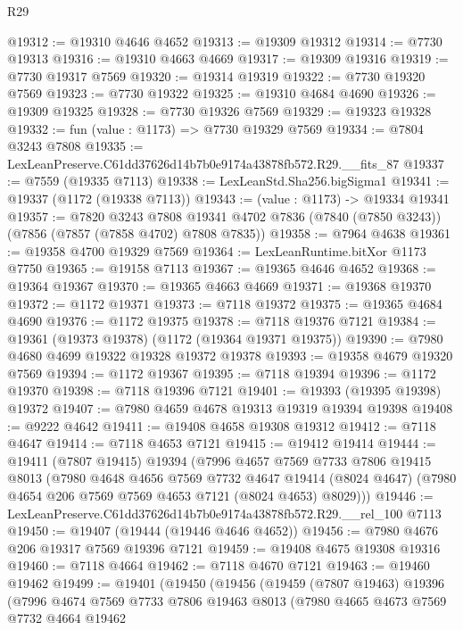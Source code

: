 \begin{lexlean}{R29}
\begin{coremodule}
@19312 := @19310 @4646 @4652
@19313 := @19309 @19312
@19314 := @7730 @19313
@19316 := @19310 @4663 @4669
@19317 := @19309 @19316
@19319 := @7730 @19317 @7569
@19320 := @19314 @19319
@19322 := @7730 @19320 @7569
@19323 := @7730 @19322
@19325 := @19310 @4684 @4690
@19326 := @19309 @19325
@19328 := @7730 @19326 @7569
@19329 := @19323 @19328
@19332 := fun (value : @1173) => @7730 @19329 @7569
@19334 := @7804 @3243 @7808
@19335 := LexLeanPreserve.C61dd37626d14b7b0e9174a43878fb572.R29.__fits_87
@19337 := @7559 (@19335 @7113)
@19338 := LexLeanStd.Sha256.bigSigma1
@19341 := @19337 (@1172 (@19338 @7113))
@19343 := (value : @1173) -> @19334 @19341
@19357 := @7820
    @3243
    @7808
    @19341
    @4702
    @7836
    (@7840 (@7850 @3243))
    (@7856 (@7857 (@7858 @4702) @7808 @7835))
@19358 := @7964 @4638
@19361 := @19358 @4700 @19329 @7569
@19364 := LexLeanRuntime.bitXor @1173 @7750
@19365 := @19158 @7113
@19367 := @19365 @4646 @4652
@19368 := @19364 @19367
@19370 := @19365 @4663 @4669
@19371 := @19368 @19370
@19372 := @1172 @19371
@19373 := @7118 @19372
@19375 := @19365 @4684 @4690
@19376 := @1172 @19375
@19378 := @7118 @19376 @7121
@19384 := @19361 (@19373 @19378) (@1172 (@19364 @19371 @19375))
@19390 := @7980 @4680 @4699 @19322 @19328 @19372 @19378
@19393 := @19358 @4679 @19320 @7569
@19394 := @1172 @19367
@19395 := @7118 @19394
@19396 := @1172 @19370
@19398 := @7118 @19396 @7121
@19401 := @19393 (@19395 @19398) @19372
@19407 := @7980 @4659 @4678 @19313 @19319 @19394 @19398
@19408 := @9222 @4642
@19411 := @19408 @4658 @19308 @19312
@19412 := @7118 @4647
@19414 := @7118 @4653 @7121
@19415 := @19412 @19414
@19444 := @19411
    (@7807 @19415)
    @19394
    (@7996
      @4657
      @7569
      @7733
      @7806
      @19415
      @8013
      (@7980
        @4648
        @4656
        @7569
        @7732
        @4647
        @19414
        (@8024 @4647)
        (@7980 @4654 @206 @7569 @7569 @4653 @7121 (@8024 @4653) @8029)))
@19446 := LexLeanPreserve.C61dd37626d14b7b0e9174a43878fb572.R29.__rel_100 @7113
@19450 := @19407 (@19444 (@19446 @4646 @4652))
@19456 := @7980 @4676 @206 @19317 @7569 @19396 @7121
@19459 := @19408 @4675 @19308 @19316
@19460 := @7118 @4664
@19462 := @7118 @4670 @7121
@19463 := @19460 @19462
@19499 := @19401
    (@19450
      (@19456
        (@19459
          (@7807 @19463)
          @19396
          (@7996
            @4674
            @7569
            @7733
            @7806
            @19463
            @8013
            (@7980
              @4665
              @4673
              @7569
              @7732
              @4664
              @19462

\end{coremodule}
\end{lexlean}
